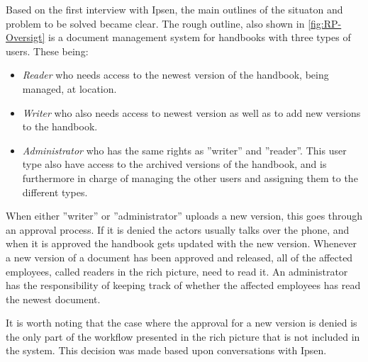 Based on the first interview with Ipsen, the main outlines of the situaton and problem to be solved became clear.
The rough outline, also shown in \cref{fig:RP-Oversigt} is a document management system for handbooks with three types of users. These being:
\begin{itemize}
	\item
		\textit{Reader} who needs access to the newest version of the handbook, being managed, at location.
	\item
		\textit{Writer} who also needs access to newest version as well as to add new versions to the handbook.
	\item
		\textit{Administrator} who has the same rights as ''writer'' and ''reader''.
		This user type also have access to the archived versions of the handbook, and is furthermore in charge of managing the other users and assigning them to the different types.
\end{itemize}
When either ''writer'' or ''administrator'' uploads a new version, this goes through an approval process.
If it is denied the actors usually talks over the phone, and when it is approved the handbook gets updated with the new version.
Whenever a new version of a document has been approved and released, all of the affected employees, called readers in the rich picture, need to read it.
An administrator has the responsibility of keeping track of whether the affected employees has read the newest document.


It is worth noting that the case where the approval for a new version is denied is the only part of the workflow presented in the rich picture that is not included in the system.
This decision was made based upon conversations with Ipsen.

